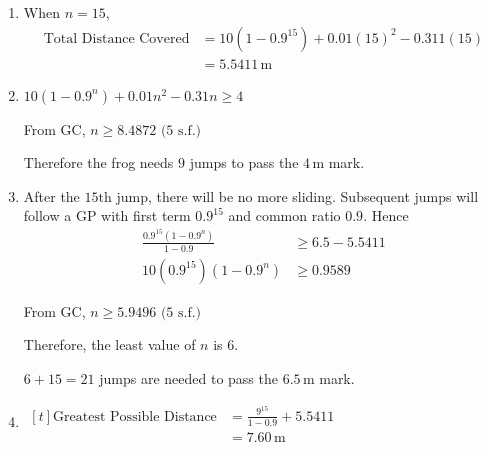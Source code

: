 \documentclass[11pt,a4paper]{book}
\begin{document}
\begin{example}
\begin{enumerate}[label=(\alph*)]
\item  When $n=15$,
\begin{align*}
\text{Total Distance Covered} & =10\left(1-0.9^{15}\right)+0.01\left(15\right)^{2}-0.311\left(15\right)\\
 & =5.5411\,\text{m}
\end{align*}

\item  $10\left(1-0.9^{n}\right)+0.01n^{2}-0.31n\geq4$

From GC, $n\geq8.4872\text{ (5 s.f.)}$

Therefore the frog needs $9$ jumps to pass the $4\,\text{m}$ mark.

\item  After the $15\text{th}$ jump, there will be no more sliding.
Subsequent jumps will follow a GP with first term $0.9^{15}$ and
common ratio $0.9$. Hence
\begin{align*}
\frac{0.9^{15}\left(1-0.9^{n}\right)}{1-0.9} & \geq6.5-5.5411\\
10\left(0.9^{15}\right)\left(1-0.9^{n}\right) & \geq0.9589
\end{align*}

From GC, $n\geq5.9496\text{ (5 s.f.)}$

Therefore, the least value of $n$ is $6$.

$6+15=21$ jumps are needed to pass the $6.5\,\text{m}$ mark.

\item
$
\begin{aligned}[t]
\text{Greatest Possible Distance} & =\frac{9^{15}}{1-0.9}+5.5411\\
 & =7.60\,\text{m}
\end{aligned}
$

\end{enumerate}

\end{example}
\end{document}
